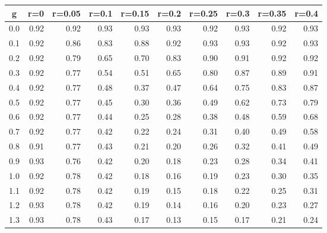 %
\begin{table}[!tbp]
 \begin{center}
 \begin{tabular}{rrrrrrrrrr}\hline\hline
\multicolumn{1}{c}{g}&\multicolumn{1}{c}{r=0}&\multicolumn{1}{c}{r=0.05}&\multicolumn{1}{c}{r=0.1}&\multicolumn{1}{c}{r=0.15}&\multicolumn{1}{c}{r=0.2}&\multicolumn{1}{c}{r=0.25}&\multicolumn{1}{c}{r=0.3}&\multicolumn{1}{c}{r=0.35}&\multicolumn{1}{c}{r=0.4}\tabularnewline
\hline
0.0&0.92&0.92&0.93&0.93&0.93&0.92&0.93&0.92&0.93\tabularnewline
0.1&0.92&0.86&0.83&0.88&0.92&0.93&0.93&0.92&0.93\tabularnewline
0.2&0.92&0.79&0.65&0.70&0.83&0.90&0.91&0.92&0.92\tabularnewline
0.3&0.92&0.77&0.54&0.51&0.65&0.80&0.87&0.89&0.91\tabularnewline
0.4&0.92&0.77&0.48&0.37&0.47&0.64&0.75&0.83&0.87\tabularnewline
0.5&0.92&0.77&0.45&0.30&0.36&0.49&0.62&0.73&0.79\tabularnewline
0.6&0.92&0.77&0.44&0.25&0.28&0.38&0.48&0.59&0.68\tabularnewline
0.7&0.92&0.77&0.42&0.22&0.24&0.31&0.40&0.49&0.58\tabularnewline
0.8&0.91&0.77&0.43&0.21&0.20&0.26&0.32&0.41&0.49\tabularnewline
0.9&0.93&0.76&0.42&0.20&0.18&0.23&0.28&0.34&0.41\tabularnewline
1.0&0.92&0.78&0.42&0.18&0.16&0.19&0.23&0.30&0.35\tabularnewline
1.1&0.92&0.78&0.42&0.19&0.15&0.18&0.22&0.25&0.31\tabularnewline
1.2&0.93&0.78&0.42&0.19&0.14&0.16&0.20&0.23&0.27\tabularnewline
1.3&0.93&0.78&0.43&0.17&0.13&0.15&0.17&0.21&0.24\tabularnewline
\hline
\end{tabular}

\end{center}

\end{table}

